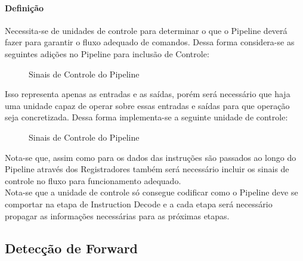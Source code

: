 \documentclass{article}
\begin{document}
\paragraph{Definição}Necessita-se de unidades de controle para determinar o que o Pipeline deverá fazer para garantir o fluxo adequado de comandos. Dessa forma considera-se as seguintes adições no Pipeline para inclusão de Controle:
\begin{figure}[H]
    \centering
    \caption{Sinais de Controle do Pipeline}
    \label{controlSimplifyPipeline}
\end{figure}
\noindent Isso representa apenas as entradas e as saídas, porém será necessário que haja uma unidade capaz de operar sobre essas entradas e saídas para que operação seja concretizada. Dessa forma implementa-se a seguinte unidade de controle:

\begin{figure}[H]
    \centering
    \caption{Sinais de Controle do Pipeline}
    \label{controlPipeline}
\end{figure}
\noindent Nota-se que, assim como para os dados das instruções são passados ao longo do Pipeline através dos Registradores também será necessário incluir os sinais de controle no fluxo para funcionamento adequado.\\

\noindent Nota-se que a unidade de controle só consegue codificar como o Pipeline deve se comportar na etapa de Instruction Decode e a cada etapa será necessário propagar as informações necessárias para as próximas etapas.


\subsection{Detecção de Forward}
\end{document}
